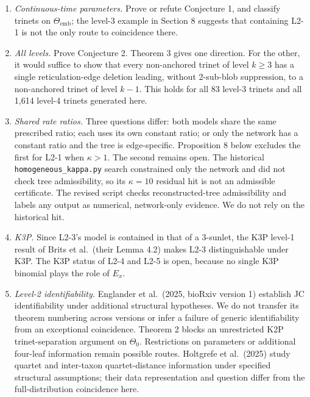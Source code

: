 \documentclass[
  11pt,
]{article}
\providecommand{\tightlist}{%
  \setlength{\itemsep}{0pt}\setlength{\parskip}{0pt}}
\begin{document}
\begin{enumerate}
\def\labelenumi{\arabic{enumi}.}
\tightlist
\item
  \emph{Continuous-time parameters.} Prove or refute Conjecture 1, and
  classify trinets on \(\Theta_{\mathrm{emb}}\); the level-3 example in
  Section 8 suggests that containing L2-1 is not the only route to
  coincidence there.
\item
  \emph{All levels.} Prove Conjecture 2. Theorem 3 gives one direction.
  For the other, it would suffice to show that every non-anchored trinet
  of level \(k\ge 3\) has a single reticulation-edge deletion leading,
  without 2-sub-blob suppression, to a non-anchored trinet of level
  \(k-1\). This holds for all 83 level-3 trinets and all 1,614 level-4
  trinets generated here.
\item
  \emph{Shared rate ratios.} Three questions differ: both models share
  the same prescribed ratio; each uses its own constant ratio; or only
  the network has a constant ratio and the tree is edge-specific.
  Proposition 8 below excludes the first for L2-1 when \(\kappa>1\). The
  second remains open. The historical \texttt{homogeneous\_kappa.py}
  search constrained only the network and did not check tree
  admissibility, so its \(\kappa=10\) residual hit is not an admissible
  certificate. The revised script checks reconstructed-tree
  admissibility and labels any output as numerical, network-only
  evidence. We do not rely on the historical hit.
\item
  \emph{K3P.} Since L2-3's model is contained in that of a 3-sunlet, the
  K3P level-1 result of Brits et al.~(their Lemma 4.2) makes L2-3
  distinguishable under K3P. The K3P status of L2-4 and L2-5 is open,
  because no single K3P binomial plays the role of \(E_x\).
\item
  \emph{Level-2 identifiability.} Englander et al.~(2025, bioRxiv
  version 1) establish JC identifiability under additional structural
  hypotheses. We do not transfer its theorem numbering across versions
  or infer a failure of generic identifiability from an exceptional
  coincidence. Theorem 2 blocks an unrestricted K2P trinet-separation
  argument on \(\Theta_0\). Restrictions on parameters or additional
  four-leaf information remain possible routes. Holtgrefe et al.~(2025)
  study quartet and inter-taxon quartet-distance information under
  specified structural assumptions; their data representation and
  question differ from the full-distribution coincidence here.
\end{enumerate}
\end{document}
